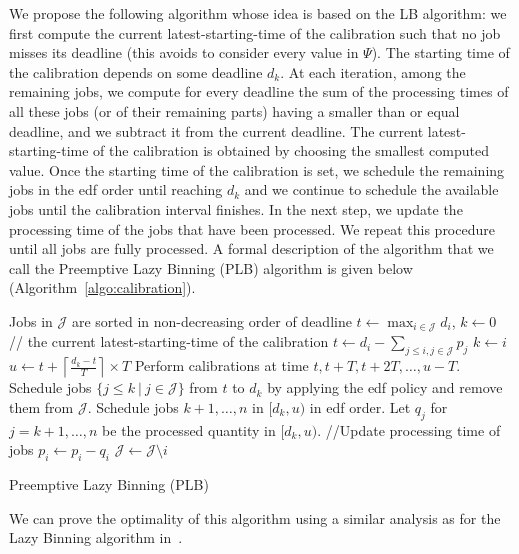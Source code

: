 We propose the following algorithm whose idea is based on the LB algorithm:  we first compute the current latest-starting-time
of the calibration
such that no job misses its deadline (this avoids to consider every value in $\Psi$).
The starting time of the calibration depends on some deadline $d_k$. At each iteration, among the remaining jobs, we compute for every deadline the sum of the processing times of all these jobs (or of their remaining parts) having a smaller than or equal deadline, and we subtract it from the current deadline. The current latest-starting-time of the calibration is obtained by choosing the smallest computed value.
Once the starting time of the calibration is
set, we schedule the remaining jobs in the {\sc edf} order until reaching
$d_k$ and we continue to schedule the available jobs until the
calibration interval finishes.
In the next step, we update the processing time of the jobs that have been
processed. We repeat this procedure until all jobs are fully processed. A formal description of the algorithm that we call the Preemptive Lazy Binning (PLB) algorithm is given below (Algorithm~\ref{algo:calibration}).

\begin{algorithm}[thbp]
\begin{algorithmic}[1] 
\STATE Jobs in $\mathcal{J}$ are sorted in non-decreasing order of deadline
	\STATE $t \gets \max_{i\in \mathcal{J}}d_i$, $k\gets 0$ // the current latest-starting-time of the calibration
			\STATE $t\gets d_i-\sum_{j\leq i,j\in \mathcal{J}}p_j$
			\STATE $k \gets i$
		\ENDIF
	\ENDFOR
\STATE $u\gets t+ \left\lceil\frac{d_k-t}{T}\right\rceil \times T$
	\STATE Perform calibrations at time $t, t+T, t+2T, \ldots, u-T$.
	\STATE Schedule jobs $\{ j\leq k ~|~j\in \mathcal{J}  \}$ from $t$ to $d_k$ by applying the {\sc edf} policy and remove them from $\mathcal{J}$.
	\STATE Schedule jobs $k+1,\ldots, n$ in $[d_k,u)$ in {\sc edf} order.
	\STATE Let $q_j$ for $j=k+1,\ldots, n$ be the processed quantity in $[d_k,u)$.
	\STATE //Update processing time of jobs
		\STATE $p_i \gets p_i - q_i$
			\STATE $\mathcal{J}\gets \mathcal{J}\setminus i$
		\ENDIF
	\ENDFOR
\ENDWHILE
\end{algorithmic}
\caption{Preemptive Lazy Binning (PLB)}
\label{algo:calibration}
\end{algorithm}

We can prove the optimality of this algorithm using a similar analysis as for the Lazy Binning algorithm in~\cite{bender2013efficient}.


